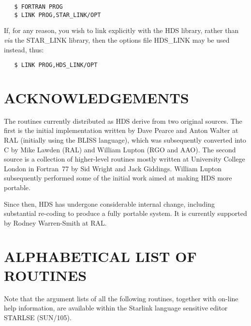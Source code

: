 \small
\begin{verbatim}
   $ FORTRAN PROG
   $ LINK PROG,STAR_LINK/OPT
\end{verbatim}
\normalsize

If, for any reason, you wish to link explicitly with the HDS library, rather
than {\em via} the STAR\_LINK library, then the options file HDS\_LINK may be
used instead, thus:

\small
\begin{verbatim}
   $ LINK PROG,HDS_LINK/OPT
\end{verbatim}
\normalsize

\section{ACKNOWLEDGEMENTS}
The routines currently distributed as HDS derive from two original sources. The
first is the initial implementation written by Dave Pearce and Anton Walter at
RAL (initially using the BLISS language), which was subsequently converted into
C by Mike Lawden (RAL) and William Lupton (RGO and AAO). The second source is a
collection of higher-level routines mostly written at University College London
in Fortran~77 by Sid Wright and Jack Giddings. William Lupton subsequently
performed some of the initial work aimed at making HDS more portable.

Since then, HDS has undergone considerable internal change, including
substantial re-coding to produce a fully portable system. It is currently
supported by Rodney Warren-Smith at RAL.

\appendix

\newpage
\section{ALPHABETICAL LIST OF ROUTINES}
\label{appendix:alphalist}

Note that the argument lists of all the following routines, together with
on-line help information, are available within the Starlink language sensitive
editor STARLSE (SUN/105).

